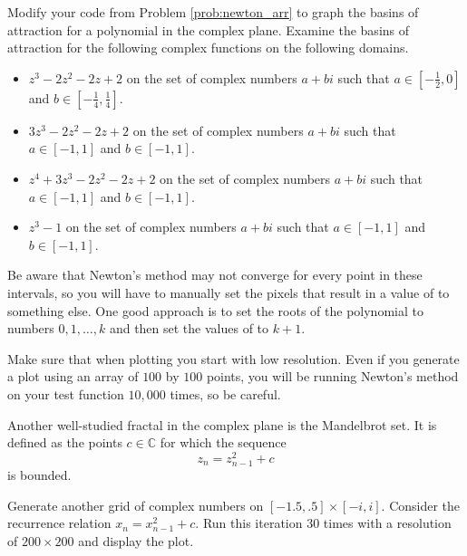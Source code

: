 \begin{problem}
Modify your code from Problem \ref{prob:newton_arr} to graph the basins of attraction for a polynomial in the complex plane.
Examine the basins of attraction for the following complex functions on the following domains.
\begin{itemize}

\item $z^3 - 2 z^2 - 2 z + 2$ on the set of complex numbers $a + b i$ such that $a \in \left[-\frac{1}{2}, 0\right]$ and $b \in \left[-\frac{1}{4}, \frac{1}{4}\right]$.

\item $3 z^3 - 2 z^2 - 2 z + 2$ on the set of complex numbers $a + b i$ such that $a \in \left[-1, 1\right]$ and $b \in \left[-1, 1\right]$.

\item $z^4 + 3 z^3 - 2 z^2 - 2 z + 2$ on the set of complex numbers $a + b i$ such that $a \in \left[-1, 1\right]$ and $b \in \left[-1, 1\right]$.

\item $z^3 - 1$ on the set of complex numbers $a + b i$ such that $a \in \left[-1, 1\right]$ and $b \in \left[-1, 1\right]$.

\end{itemize}
Be aware that Newton's method may not converge for every point in these intervals, so you will have to manually set the pixels that result in a value of  to something else.
One good approach is to set the roots of the polynomial to numbers $0, 1, \dots, k$ and then set the values of  to $k+1$.

Make sure that when plotting you start with low resolution.
Even if you generate a plot using an array of $100$ by $100$ points, you will be running Newton's method on your test function $10,000$ times, so be careful.
\end{problem}

Another well-studied fractal in the complex plane is the Mandelbrot set.
It is defined as the points $c \in \mathbb{C}$ for which the sequence
\[z_n = z_{n-1}^2 + c\]
is bounded.

\begin{problem}
Generate another grid of complex numbers on $[-1.5,.5]\times[-i,i]$.
Consider the recurrence relation $x_n = x_{n-1}^2 + c$.
Run this iteration 30 times with a resolution of $200 \times 200$ and display the plot.
\end{problem}
